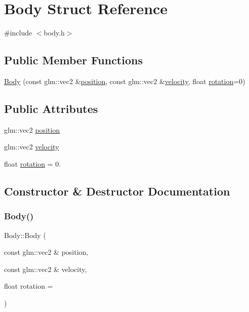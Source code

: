 \hypertarget{structBody}{}\section{Body Struct Reference}
\label{structBody}


{\ttfamily \#include $<$body.\+h$>$}

\subsection*{Public Member Functions}
\begin{DoxyCompactItemize}
\item 
\hyperlink{structBody_a0c30b09e1d2be75e0e88fbcf97fbe446}{Body} (const glm\+::vec2 \&\hyperlink{structBody_aa209ca47cc5d2914c1b8e5d1a02f502d}{position}, const glm\+::vec2 \&\hyperlink{structBody_a9f3812969ac9d1438054854f8ff90600}{velocity}, float \hyperlink{structBody_a390b12d4160243ae0f38aee3a34b417b}{rotation}=0)
\end{DoxyCompactItemize}
\subsection*{Public Attributes}
\begin{DoxyCompactItemize}
\item 
glm\+::vec2 \hyperlink{structBody_aa209ca47cc5d2914c1b8e5d1a02f502d}{position}
\item 
glm\+::vec2 \hyperlink{structBody_a9f3812969ac9d1438054854f8ff90600}{velocity}
\item 
float \hyperlink{structBody_a390b12d4160243ae0f38aee3a34b417b}{rotation} = 0.
\end{DoxyCompactItemize}


\subsection{Constructor \& Destructor Documentation}
\mbox{\label{structBody_a0c30b09e1d2be75e0e88fbcf97fbe446}} 
\subsubsection{\texorpdfstring{Body()}{Body()}}
{\footnotesize\ttfamily Body\+::\+Body (\begin{DoxyParamCaption}\item[{const glm\+::vec2 \&}]{position,  }\item[{const glm\+::vec2 \&}]{velocity,  }\item[{float}]{rotation = {} }\end{DoxyParamCaption})\hspace{0.3cm}{\ttfamily [inline]}}



